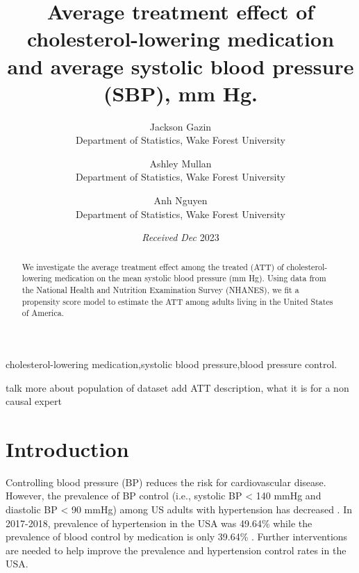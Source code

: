 \documentclass[useAMS,usenatbib,referee]{biom}
\title[]{Average treatment effect of cholesterol-lowering medication and
average systolic blood pressure (SBP), mm Hg.}
\author{ Jackson
Gazin \email{\href{mailto:gazij22@wfu.edu}{\nolinkurl{gazij22@wfu.edu}}} \\ Department
of Statistics, Wake Forest University  \and
		 Ashley
Mullan \email{\href{mailto:mullae22@wfu.edu}{\nolinkurl{mullae22@wfu.edu}}} \\ Department
of Statistics, Wake Forest University  \and
		 Anh
Nguyen \email{\href{mailto:nguyp22@wfu.edu}{\nolinkurl{nguyp22@wfu.edu}}} \\ Department
of Statistics, Wake Forest University 
	   }
\begin{document}
\date{{\it Received Dec} 2023}

\pagerange{\pageref{firstpage}--\pageref{lastpage}} 



\label{firstpage}


\begin{abstract}
We investigate the average treatment effect among the treated (ATT) of
cholesterol-lowering medication on the mean systolic blood pressure (mm
Hg). Using data from the National Health and Nutrition Examination
Survey (NHANES), we fit a propensity score model to estimate the ATT
among adults living in the United States of America.
\end{abstract}

%
%

\begin{keywords}
cholesterol-lowering medication,systolic blood pressure,blood pressure
control.
\end{keywords}

\maketitle

talk more about population of dataset add ATT description, what it is
for a non causal expert

\hypertarget{intro}{%
\section{Introduction}\label{intro}}

Controlling blood pressure (BP) reduces the risk for cardiovascular
disease. However, the prevalence of BP control (i.e., systolic BP
\textless{} 140 mmHg and diastolic BP \textless{} 90 mmHg) among US
adults with hypertension has decreased \citep{cdc_prevalence_nodate}. In
2017-2018, prevalence of hypertension in the USA was 49.64\% while the
prevalence of blood control by medication is only 39.64\%
\citep{chobufo_prevalence_2020}. Further interventions are needed to
help improve the prevalence and hypertension control rates in the USA.
\end{document}
